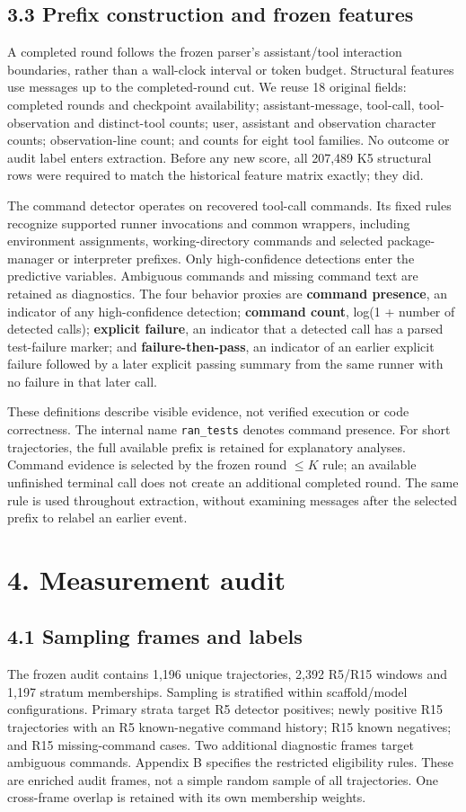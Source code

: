 \documentclass[10pt,a4paper]{article}
\begin{document}
\subsection{3.3 Prefix construction and frozen features}
A completed round follows the frozen parser's assistant/tool interaction boundaries, rather than a wall-clock interval or token budget. Structural features use messages up to the completed-round cut. We reuse 18 original fields: completed rounds and checkpoint availability; assistant-message, tool-call, tool-observation and distinct-tool counts; user, assistant and observation character counts; observation-line count; and counts for eight tool families. No outcome or audit label enters extraction. Before any new score, all 207,489 K5 structural rows were required to match the historical feature matrix exactly; they did.

The command detector operates on recovered tool-call commands. Its fixed rules recognize supported runner invocations and common wrappers, including environment assignments, working-directory commands and selected package-manager or interpreter prefixes. Only high-confidence detections enter the predictive variables. Ambiguous commands and missing command text are retained as diagnostics. The four behavior proxies are \textbf{command presence}, an indicator of any high-confidence detection; \textbf{command count}, log(1 + number of detected calls); \textbf{explicit failure}, an indicator that a detected call has a parsed test-failure marker; and \textbf{failure-then-pass}, an indicator of an earlier explicit failure followed by a later explicit passing summary from the same runner with no failure in that later call.

These definitions describe visible evidence, not verified execution or code correctness. The internal name \texttt{ran\_tests} denotes command presence. For short trajectories, the full available prefix is retained for explanatory analyses. Command evidence is selected by the frozen round $\leq K$ rule; an available unfinished terminal call does not create an additional completed round. The same rule is used throughout extraction, without examining messages after the selected prefix to relabel an earlier event.

\section{4. Measurement audit}
\subsection{4.1 Sampling frames and labels}
The frozen audit contains 1,196 unique trajectories, 2,392 R5/R15 windows and 1,197 stratum memberships. Sampling is stratified within scaffold/model configurations. Primary strata target R5 detector positives; newly positive R15 trajectories with an R5 known-negative command history; R15 known negatives; and R15 missing-command cases. Two additional diagnostic frames target ambiguous commands. Appendix B specifies the restricted eligibility rules. These are enriched audit frames, not a simple random sample of all trajectories. One cross-frame overlap is retained with its own membership weights.
\end{document}
